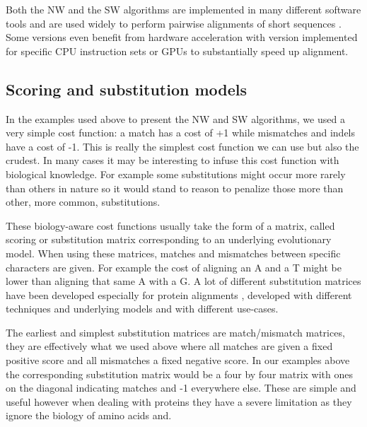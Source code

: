 \documentclass[
  11pt,
  twoside]{scrbook}
\begin{document}
Both the NW and the SW algorithms are implemented in many different software tools and are used widely to perform pairwise alignments of short sequences \autocite{stajichBioperlToolkitPerl2002,gentlemanBioconductorOpenSoftware2004,riceEMBOSSEuropeanMolecular2000}. Some versions even benefit from hardware acceleration with version implemented for specific CPU instruction sets \autocite{dailyParasailSIMDLibrary2016} or GPUs \autocite{frohmbergGPASImprovedVersion2012} to substantially speed up alignment.

\hypertarget{scoring-and-substitution-models}{%
\subsection{Scoring and substitution models}\label{scoring-and-substitution-models}}

In the examples used above to present the NW and SW algorithms, we used a very simple cost function: a match has a cost of +1 while mismatches and indels have a cost of -1. This is really the simplest cost function we can use but also the crudest. In many cases it may be interesting to infuse this cost function with biological knowledge. For example some substitutions might occur more rarely than others in nature so it would stand to reason to penalize those more than other, more common, substitutions.

These biology-aware cost functions usually take the form of a matrix, called scoring or substitution matrix corresponding to an underlying evolutionary model. When using these matrices, matches and mismatches between specific characters are given. For example the cost of aligning an A and a T might be lower than aligning that same A with a G. A lot of different substitution matrices have been developed especially for protein alignments \autocite{altschulSubstitutionMatrices2013}, developed with different techniques and underlying models and with different use-cases.

The earliest and simplest substitution matrices are match/mismatch matrices, they are effectively what we used above where all matches are given a fixed positive score and all mismatches a fixed negative score. In our examples above the corresponding substitution matrix would be a four by four matrix with ones on the diagonal indicating matches and -1 everywhere else. These are simple and useful however when dealing with proteins they have a severe limitation as they ignore the biology of amino acids and.
\end{document}
